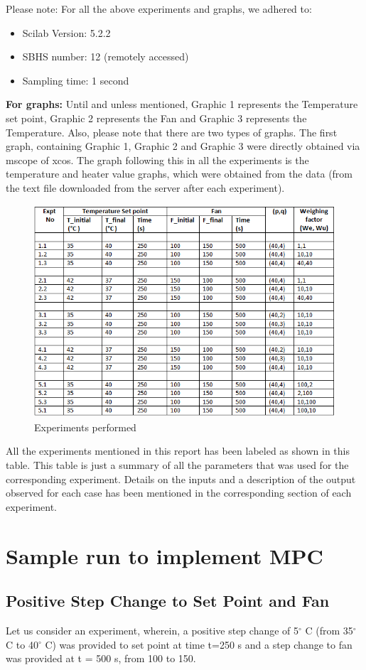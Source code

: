 Please note: For all the above experiments and graphs, we adhered to: 
\begin{itemize}
\item Scilab Version: 5.2.2
\item SBHS number: 12 (remotely accessed)
\item Sampling time: 1 second
\end{itemize}
\textbf{For graphs:} Until and unless mentioned, Graphic 1 represents the Temperature set point, Graphic 2 represents the Fan and Graphic 3 represents the Temperature.  Also, please note that there are two types of graphs. The first graph, containing Graphic 1, Graphic 2 and Graphic 3 were directly obtained via mscope of xcos. The graph following this in all the experiments is the temperature and heater value graphs, which were obtained from the data (from the text file downloaded from the server after each experiment).
\begin{figure}[H]
\centering
  \includegraphics[width=0.7\linewidth]{mpc/table_normal.png}
  \caption{Experiments performed}
\end{figure}
All the experiments mentioned in this report has been labeled as shown in this table. This table is just a summary of all the parameters that was used for the corresponding experiment. Details on the inputs and a description of the output observed for each case has been mentioned in the corresponding section of each experiment.

\section{Sample run to implement MPC}
\subsection{Positive Step Change to Set Point and Fan}
Let us consider an experiment, wherein, a positive step change of 5$^\circ$ C (from 35$^\circ$ C to 40$^\circ$ C) was provided to set point at time t=250 s and a step change to fan was provided at t = 500 s, from 100 to 150. 

